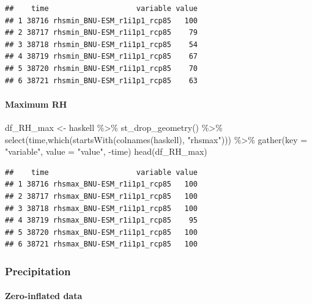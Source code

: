 \documentclass[
  paper=a4,
  ,captions=tableheading
]{scrartcl}
\newenvironment{Shaded}{\begin{snugshade}}{\end{snugshade}}
\newcommand{\AttributeTok}[1]{\textcolor[rgb]{0.77,0.63,0.00}{#1}}
\newcommand{\FunctionTok}[1]{\textcolor[rgb]{0.00,0.00,0.00}{#1}}
\newcommand{\NormalTok}[1]{#1}
\newcommand{\OtherTok}[1]{\textcolor[rgb]{0.56,0.35,0.01}{#1}}
\newcommand{\SpecialCharTok}[1]{\textcolor[rgb]{0.00,0.00,0.00}{#1}}
\newcommand{\StringTok}[1]{\textcolor[rgb]{0.31,0.60,0.02}{#1}}
\begin{document}
\begin{verbatim}
##    time                    variable value
## 1 38716 rhsmin_BNU-ESM_r1i1p1_rcp85   100
## 2 38717 rhsmin_BNU-ESM_r1i1p1_rcp85    79
## 3 38718 rhsmin_BNU-ESM_r1i1p1_rcp85    54
## 4 38719 rhsmin_BNU-ESM_r1i1p1_rcp85    67
## 5 38720 rhsmin_BNU-ESM_r1i1p1_rcp85    70
## 6 38721 rhsmin_BNU-ESM_r1i1p1_rcp85    63
\end{verbatim}

\hypertarget{maximum-rh}{%
\paragraph{Maximum RH}\label{maximum-rh}}

\begin{Shaded}
\begin{Highlighting}[]
\NormalTok{df\_RH\_max }\OtherTok{\textless{}{-}}\NormalTok{ haskell }\SpecialCharTok{\%\textgreater{}\%}
  \FunctionTok{st\_drop\_geometry}\NormalTok{() }\SpecialCharTok{\%\textgreater{}\%}
  \FunctionTok{select}\NormalTok{(time,}\FunctionTok{which}\NormalTok{(}\FunctionTok{startsWith}\NormalTok{(}\FunctionTok{colnames}\NormalTok{(haskell), }\StringTok{"rhsmax"}\NormalTok{))) }\SpecialCharTok{\%\textgreater{}\%}
  \FunctionTok{gather}\NormalTok{(}\AttributeTok{key =} \StringTok{"variable"}\NormalTok{, }\AttributeTok{value =} \StringTok{"value"}\NormalTok{, }\SpecialCharTok{{-}}\NormalTok{time)}
\FunctionTok{head}\NormalTok{(df\_RH\_max)}
\end{Highlighting}
\end{Shaded}

\begin{verbatim}
##    time                    variable value
## 1 38716 rhsmax_BNU-ESM_r1i1p1_rcp85   100
## 2 38717 rhsmax_BNU-ESM_r1i1p1_rcp85   100
## 3 38718 rhsmax_BNU-ESM_r1i1p1_rcp85   100
## 4 38719 rhsmax_BNU-ESM_r1i1p1_rcp85    95
## 5 38720 rhsmax_BNU-ESM_r1i1p1_rcp85   100
## 6 38721 rhsmax_BNU-ESM_r1i1p1_rcp85   100
\end{verbatim}

\hypertarget{precipitation}{%
\subsubsection{Precipitation}\label{precipitation}}

\hypertarget{zero-inflated-data}{%
\paragraph{Zero-inflated data}\label{zero-inflated-data}}
\end{document}
